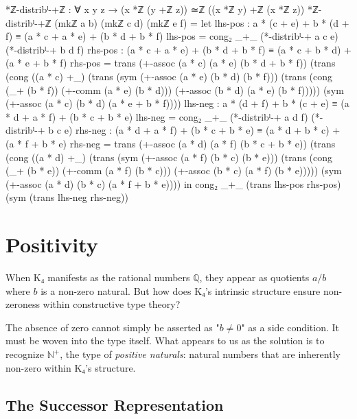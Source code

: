 \documentclass[11pt,a4paper]{book}
\begin{document}
\begin{code}
*ℤ-distribˡ-+ℤ : ∀ x y z → (x *ℤ (y +ℤ z)) ≃ℤ ((x *ℤ y) +ℤ (x *ℤ z))
*ℤ-distribˡ-+ℤ (mkℤ a b) (mkℤ c d) (mkℤ e f) = 
  let
      lhs-pos : a * (c + e) + b * (d + f) ≡ (a * c + a * e) + (b * d + b * f)
      lhs-pos = cong₂ _+_ (*-distribˡ-+ a c e) (*-distribˡ-+ b d f)
      rhs-pos : (a * c + a * e) + (b * d + b * f) ≡ (a * c + b * d) + (a * e + b * f)
      rhs-pos = trans (+-assoc (a * c) (a * e) (b * d + b * f))
                (trans (cong ((a * c) +_) (trans (sym (+-assoc (a * e) (b * d) (b * f)))
                                          (trans (cong (_+ (b * f)) (+-comm (a * e) (b * d)))
                                                 (+-assoc (b * d) (a * e) (b * f)))))
                       (sym (+-assoc (a * c) (b * d) (a * e + b * f))))
      lhs-neg : a * (d + f) + b * (c + e) ≡ (a * d + a * f) + (b * c + b * e)
      lhs-neg = cong₂ _+_ (*-distribˡ-+ a d f) (*-distribˡ-+ b c e)
      rhs-neg : (a * d + a * f) + (b * c + b * e) ≡ (a * d + b * c) + (a * f + b * e)
      rhs-neg = trans (+-assoc (a * d) (a * f) (b * c + b * e))
                (trans (cong ((a * d) +_) (trans (sym (+-assoc (a * f) (b * c) (b * e)))
                                          (trans (cong (_+ (b * e)) (+-comm (a * f) (b * c)))
                                                 (+-assoc (b * c) (a * f) (b * e)))))
                       (sym (+-assoc (a * d) (b * c) (a * f + b * e))))
  in cong₂ _+_ (trans lhs-pos rhs-pos) (sym (trans lhs-neg rhs-neg))
\end{code}

\chapter{Positivity}

When K₄ manifests as the rational numbers $\mathbb{Q}$, they appear as 
quotients $a/b$ where $b$ is a non-zero natural. But how does K₄'s intrinsic structure 
ensure non-zeroness within constructive type theory?

The absence of zero cannot simply be asserted as "$b \ne 0$" as a side condition. It must be woven into the 
type itself. What appears to us as the solution is to recognize $\mathbb{N}^+$, the type of \emph{positive naturals}: 
natural numbers that are inherently non-zero within K₄'s structure.

\section{The Successor Representation}
\end{document}
